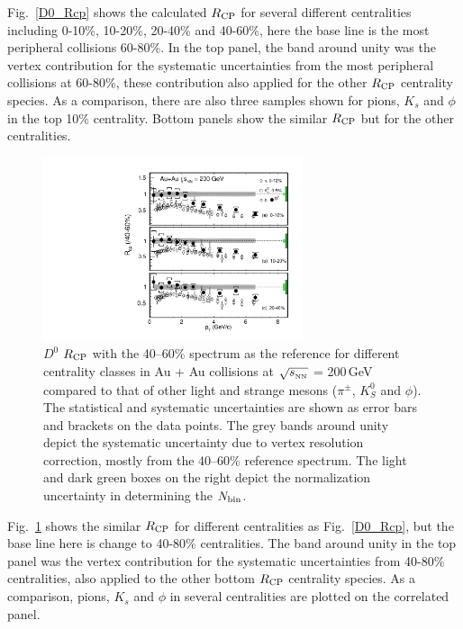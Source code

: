 Fig.~\ref{D0_Rcp} shows the calculated $R_{\rm CP}$ for several different centralities including 0-10\%, 10-20\%, 20-40\% and 40-60\%, here the base line is the most peripheral collisions 60-80\%. In the top panel, the band around unity was the vertex contribution for the systematic uncertainties from the most peripheral collisions at 60-80\%, these contribution also applied for the other $R_{\rm CP}$ centrality species. As a comparison, there are also three samples shown for pions, $K_{s}$ and $\phi$ in the top 10\% centrality. Bottom panels show the similar $R_{\rm CP}$ but for the other centralities.

\begin{figure}
\centering
\includegraphics[width=0.68\textwidth]{figure/Run14_D0HFT/D0_Rcp2.pdf}
\caption{$D^{0}$ $R_{\rm CP}$ with the 40--60\% spectrum as the reference for different centrality classes in Au + Au collisions at $\sqrt{s_{_{\rm NN}}}$ = 200\,GeV compared to that of other light and strange mesons ($\pi^{\pm}$, $K^0_{S}$ and $\phi$). The statistical and systematic uncertainties are shown as error bars and brackets on the data points. The grey bands around unity depict the systematic uncertainty due to vertex resolution correction, mostly from the 40--60\% reference spectrum. The light and dark green boxes on the right depict the normalization uncertainty in determining the $N_{\rm bin}$.}
\label{D0_Rcp2} 
\end{figure}

Fig.~\ref{D0_Rcp2} shows the similar $R_{\rm CP}$ for different centralities as Fig.~\ref{D0_Rcp}, but the base line here is change to 40-80\% centralities. The band around unity in the top panel was the vertex contribution for the systematic uncertainties from 40-80\% centralities, also applied to the other bottom $R_{\rm CP}$ centrality species. As a comparison, pions, $K_{s}$ and $\phi$ in several centralities are plotted on the correlated panel.

